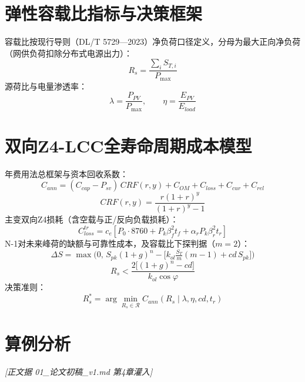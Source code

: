 \documentclass[a4paper,11pt]{ctexart}   %
\begin{document}
\section{弹性容载比指标与决策框架}
容载比按现行导则（DL/T 5729—2023）净负荷口径定义，分母为最大正向净负荷（网供负荷扣除分布式电源出力）：
\begin{equation}
R_s=\frac{\sum_i S_{T,i}}{P_{\max}}
\end{equation}
源荷比与电量渗透率：
\begin{equation}
\lambda=\frac{P_{PV}}{P_{\max}},\qquad \eta=\frac{E_{PV}}{E_{load}}
\end{equation}

\section{双向Z4-LCC全寿命周期成本模型}
年费用法总框架与资本回收系数：
\begin{equation}
C_{ann}=(C_{cap}-P_{sv})\,CRF(r,y)+C_{OM}+C_{loss}+C_{cur}+C_{rel}
\end{equation}
\begin{equation}
CRF(r,y)=\frac{r(1+r)^{y}}{(1+r)^{y}-1}
\end{equation}
主变双向Z4损耗（含空载与正/反向负载损耗）：
\begin{equation}
C_{loss}^{tr}=c_e\!\left[P_0\cdot 8760+P_k\beta_f^{2}t_f+\alpha_r P_k\beta_r^{2}t_r\right]
\end{equation}
N-1对未来峰荷的缺额与可靠性成本，及容载比下探判据（$m=2$）：
\begin{equation}
\Delta S=\max\!\Big(0,\,S_{pk}(1+g)^{n}-\big[k_{ol}\tfrac{S_T}{m}(m-1)+cd\,S_{pk}\big]\Big)
\end{equation}
\begin{equation}
R_s<\frac{2\big[(1+g)^{n}-cd\big]}{k_{ol}\cos\varphi}
\end{equation}
决策准则：
\begin{equation}
R_s^{*}=\arg\min_{R_s\in\mathcal{R}} C_{ann}(R_s\mid\lambda,\eta,cd,t_r)
\end{equation}

\section{算例分析}
\emph{[正文据 01\_论文初稿\_v1.md 第4章灌入]}
\end{document}
